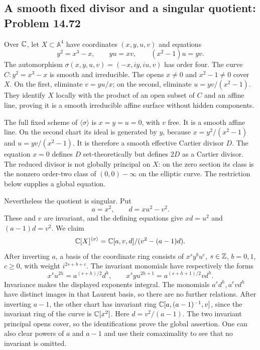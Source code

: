 \subsection{A smooth fixed divisor and a singular quotient: Problem 14.72}
\label{cand:14.72}

Over \(\mathbb C\), let \(X\subset\mathbb A^4\) have coordinates
\((x,y,u,v)\) and equations
\[
 y^2=x^3-x,\qquad yu=xv,\qquad (x^2-1)u=yv.
\]
The automorphism
\(\sigma(x,y,u,v)=(-x,iy,iu,v)\) has order four.
The curve \(C:y^2=x^3-x\) is smooth and irreducible.
The opens \(x\ne0\) and \(x^2-1\ne0\) cover \(X\).
On the first, eliminate \(v=yu/x\); on the second,
eliminate \(u=yv/(x^2-1)\). They identify \(X\)
locally with the product of an open subset of \(C\)
and an affine line, proving it is a smooth irreducible
affine surface without hidden components.

The full fixed scheme of \(\langle\sigma\rangle\) is
\(x=y=u=0\), with \(v\) free. It is a smooth affine
line. On the second chart its ideal is generated by
\(y\), because \(x=y^2/(x^2-1)\) and
\(u=yv/(x^2-1)\). It is therefore a smooth effective Cartier divisor \(D\).
The equation \(x=0\) defines \(D\) set-theoretically but defines
\(2D\) as a Cartier divisor. The reduced divisor is not globally
principal on \(X\): on the zero section its class is the nonzero
order-two class of \((0,0)-\infty\) on the elliptic curve.
The restriction below supplies a global equation.

Nevertheless the quotient is singular. Put
\[
 a=x^2,\qquad d=xu^2-v^2.
\]
These and \(v\) are invariant, and the defining equations
give \(xd=u^2\) and \((a-1)d=v^2\). We claim
\[
 \mathbb C[X]^{\langle\sigma\rangle}
       =\mathbb C[a,v,d]/(v^2-(a-1)d).
\]
After inverting \(a\), a basis of the coordinate ring
consists of \(x^s y^b u^c\), \(s\in\mathbb Z\), \(b=0,1\),
\(c\geq0\), with weight \(i^{2s+b+c}\).
The invariant monomials have respectively the forms
\[
 x^s u^{2h}=a^{(s+h)/2}d^h,\qquad
 x^s y u^{2h+1}=a^{(s+h+1)/2}vd^h.
\]
Invariance makes the displayed exponents integral.
The monomials \(a^r d^h,a^r v d^h\) have distinct
images in that Laurent basis, so there are no
further relations. After inverting \(a-1\), the other
chart has invariant ring
\(\mathbb C[a,(a-1)^{-1},v]\), since the invariant ring of
the curve is \(\mathbb C[x^2]\). Here \(d=v^2/(a-1)\).
The two invariant principal opens cover, so the
identifications prove the global assertion. One can
also clear powers of \(a\) and \(a-1\) and use their
comaximality to see that no invariant is omitted.

